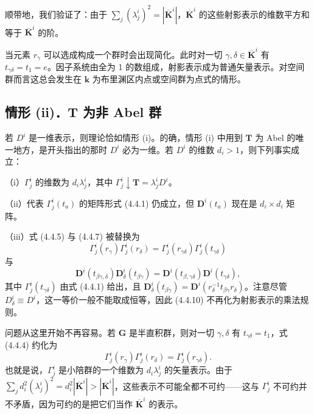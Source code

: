 顺带地，我们验证了：由于 $\sum_{j}\left(\lambda^{i}_{j}\right)^{2} = |\overline{\mathbf{K}}^{i}|$，$\overline{\mathbf{K}}^{i}$ 的这些射影表示的维数平方和等于 $\overline{\mathbf{K}}^{i}$ 的阶。

当元素 $r_{\gamma}$ 可以选成构成一个群时会出现简化。此时对一切 $\gamma, \delta \in \overline{\mathbf{K}}^{i}$ 有 $t_{\gamma\delta} = t_{1} = e$。因子系统由全为 1 的数组成，射影表示成为普通矢量表示。对空间群而言这总会发生在 $\mathbf{k}$ 为布里渊区内点或空间群为点式的情形。

\subsection*{情形 (ii)．$\mathbf{T}$ 为非 Abel 群}

若 $D^{i}$ 是一维表示，则理论恰如情形 (i)。的确，情形 (i) 中用到 $\mathbf{T}$ 为 Abel 的唯一地方，是开头指出的那时 $D^{i}$ 必为一维。若 $D^{i}$ 的维数 $d_{i} > 1$，则下列事实成立：

（i）$\Gamma^{i}_{j}$ 的维数为 $d_{i}\lambda^{i}_{j}$，其中 $\Gamma^{i}_{j} \downarrow \mathbf{T} = \lambda^{i}_{j}D^{i}$。

（ii）代表 $\Gamma^{i}_{j}(t_{a})$ 的矩阵形式 (4.4.1) 仍成立，但 $\mathbf{D}^{i}(t_{a})$ 现在是 $d_{i} \times d_{i}$ 矩阵。

（iii）式 (4.4.5) 与 (4.4.7) 被替换为
\begin{equation*}
\Gamma^{i}_{j}(r_{\gamma})\Gamma^{i}_{j}(r_{\delta}) = \Gamma^{i}_{j}(r_{\gamma\delta})\Gamma^{i}_{j}(t_{\gamma\delta})
\end{equation*}
与
\begin{equation*}
\mathbf{D}^{i}(t_{\beta\gamma, \delta})\mathbf{D}^{i}_{\delta}(t_{\beta\gamma}) = \mathbf{D}^{i}(t_{\beta, \gamma\delta})\mathbf{D}^{i}(t_{\gamma\delta}),
\tag{4.4.10}
\end{equation*}
其中 $\Gamma^{i}_{j}(t_{\gamma\delta})$ 由式 (4.4.1) 给出，且 $\mathbf{D}^{i}_{\delta}(t_{\beta\gamma}) = \mathbf{D}^{i}(r^{-1}_{\delta}t_{\beta\gamma}r_{\delta})$。注意尽管 $D^{i}_{\delta} \equiv D^{i}$，这一等价一般不能取成恒等，因此 (4.4.10) 不再化为射影表示的乘法规则。

问题从这里开始不再容易。若 $\mathbf{G}$ 是半直积群，则对一切 $\gamma, \delta$ 有 $t_{\gamma\delta} = t_{1}$，式 (4.4.4) 约化为
\begin{equation*}
\Gamma^{i}_{j}(r_{\gamma})\Gamma^{i}_{j}(r_{\delta}) = \Gamma^{i}_{j}(r_{\gamma\delta}).
\tag{4.4.11}
\end{equation*}
也就是说，$\Gamma^{i}_{j}$ 是小陪群的一个维数为 $d_{i}\lambda^{i}_{j}$ 的矢量表示。由于 $\sum_{j}d^{2}_{i}\left(\lambda^{i}_{j}\right)^{2} = d^{2}_{i}|\overline{\mathbf{K}}^{i}| > |\overline{\mathbf{K}}^{i}|$，这些表示不可能全都不可约——这与 $\Gamma^{i}_{j}$ 不可约并不矛盾，因为可约的是把它们当作 $\overline{\mathbf{K}}^{i}$ 的表示。

